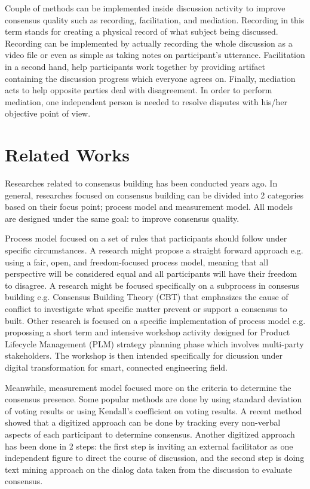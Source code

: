 \documentclass[10pt, conference, compsocconf]{IEEEtran}
\begin{document}
Couple of methods can be implemented inside discussion activity to improve consensus quality such as recording, facilitation, and mediation\cite{b1}. Recording in this term stands for creating a physical record of what subject being discussed. Recording can be implemented by actually recording the whole discussion as a video file or even as simple as taking notes on participant's utterance. Facilitation in a second hand, help participants work together by providing artifact containing the discussion progress which everyone agrees on. Finally, mediation acts to help opposite parties deal with disagreement. In order to perform mediation, one independent person is needed to resolve disputes with his/her objective point of view.

\section{Related Works}
\label{sec_rp}
Researches related to consensus building has been conducted years ago. In general, researches focused on consensus building can be divided into 2 categories based on their focus point; process model and measurement model. All models are designed under the same goal: to improve consensus quality.

Process model focused on a set of rules that participants should follow under specific circumstances. A research might propose a straight forward approach e.g.  using a fair, open, and freedom-focused process model\cite{b20}, meaning that all perspective will be considered equal and all participants will have their freedom to disagree. A research might be focused specifically on a subprocess in consesus building e.g. Consensus Building Theory (CBT)\cite{b21}  that emphasizes the cause of conflict to investigate what specific matter prevent or support a consensus to built. Other research is focused on a specific implementation of process model\cite{b3} e.g. propossing a short term and intensive workshop activity designed for Product Lifecycle Management (PLM) strategy planning phase which involves multi-party stakeholders. The workshop is then intended specifically for dicussion under digital transformation for smart, connected engineering field.

Meanwhile, measurement model focused more on the criteria to determine the consensus presence. Some popular methods are done by using standard deviation of voting results or using Kendall's coefficient on voting results\cite{b22}. A recent method showed that a digitized approach can be done by tracking every non-verbal aspects of each participant to determine consensus\cite{b5}. Another digitized approach has been done in 2 steps: the first step is inviting an external facilitator as one independent figure to direct the course of discussion, and the second step is doing text mining approach on the dialog data taken from the discussion to evaluate consensus\cite{b4}.   
\end{document}
